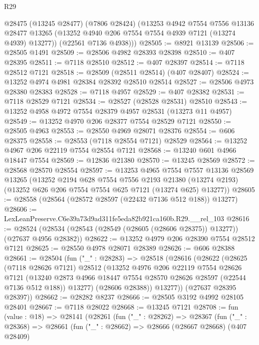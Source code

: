 \begin{lexlean}{R29}
\begin{coremodule}
      @28475
        (@13245 @28477)
        (@7806 @28424)
        (@13253
          @4942
          @7554
          @7556
          @13136
          @28477
          @13265
          (@13252 @4940 @206 @7554 @7554 @4939 @7121 (@13274 @4939) @13277))
        (@22561 @7136 @4938)))
@28505 := @8921 @13139
@28506 := @28505 @1491
@28509 := @28506 @4982 @28393 @28398
@28510 := @407 @28395
@28511 := @7118 @28510
@28512 := @407 @28397
@28514 := @7118 @28512 @7121
@28518 := @28509 (@28511 @28514) (@407 @28407)
@28524 := @13252 @4974 @4981 @28384 @28392 @28510 @28514
@28527 := @28506 @4973 @28380 @28383
@28528 := @7118 @4957
@28529 := @407 @28382
@28531 := @7118 @28529 @7121
@28534 := @28527 (@28528 @28531) @28510
@28543 := @13252 @4958 @4972 @7554 @28379 @4957 @28531 (@13273 @11 @4957)
@28549 := @13252 @4970 @206 @28377 @7554 @28529 @7121
@28550 := @28505 @4963
@28553 := @28550 @4969 @28071 @28376
@28554 := @606 @28375
@28558 := @28553 (@7118 @28554 @7121) @28529
@28564 := @13252 @4967 @206 @22119 @7554 @28554 @7121
@28568 := @13240 @601 @4966 @18447 @7554
@28569 := @12836 @21380
@28570 := @13245 @28569
@28572 := @28568 @28570 @28554
@28597 := @13253
    @4965
    @7554
    @7557
    @13136
    @28569
    @13265
    (@13252
      @2194
      @628
      @7554
      @7556
      @2193
      @21380
      (@13274 @2193)
      (@13252 @626 @206 @7554 @7554 @625 @7121 (@13274 @625) @13277))
@28605 := @28558 (@28564 (@28572 @28597 (@22432 @7136 @512 @188)) @13277)
@28606 := LexLeanPreserve.C6e39a73d9ad311fe5eda82b921ca160b.R29.__rel_103
@28616 := @28524 (@28534 (@28543 (@28549 (@28605 (@28606 @28375)) @13277)) (@27637 @4956 @28382))
@28622 := @13252 @4979 @206 @28390 @7554 @28512 @7121
@28625 := @28550 @4978 @28071 @28389
@28626 := @606 @28388
@28661 := @28504
    (fun ("_" : @28283) =>
    @28518
      (@28616
        (@28622
          (@28625
            (@7118 @28626 @7121)
            @28512
            (@13252
              @4976
              @206
              @22119
              @7554
              @28626
              @7121
              (@13240 @2873 @4966 @18447 @7554 @28570 @28626 @28597 (@22544 @7136 @512 @188))
              @13277)
            (@28606 @28388))
          @13277))
      (@27637 @28395 @28397))
@28662 := @28282 @8237
@28666 := @28505 @3192 @4992 @28105 @28401
@28667 := @7118 @28022
@28668 := @13245 @7121
@28708 := fun (value : @18) =>
  @28141
    (@28261
      (fun ("_" : @28262) =>
      @28367
        (fun ("_" : @28368) =>
        @28661
          (fun ("_" : @28662) =>
          @28666
            (@28667 @28668)
            (@407 @28409)

\end{coremodule}
\end{lexlean}
